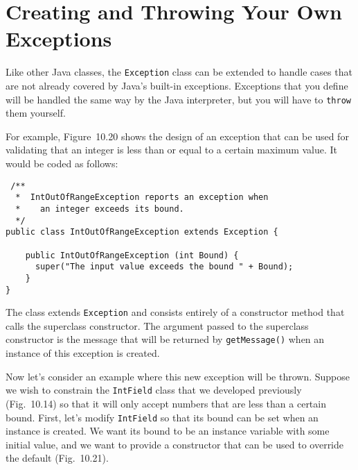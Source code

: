 \section{Creating and Throwing Your Own \\ Exceptions}
\label{sec-throws}\label{pg-sec-throws}

\noindent Like other Java classes, the {\tt Exception} class can be extended to
handle cases that are not already covered by Java's built-in
exceptions.  Exceptions that you define will be handled the same way
by the Java interpreter, but you will have to {\tt throw} them
yourself.

For example, Figure~10.20 shows the design of an exception
that can be used for validating that an integer is less than or equal
to a certain maximum value. It would be coded as follows:

\begin{jjjlisting}
\begin{lstlisting}
 /**
  *  IntOutOfRangeException reports an exception when 
  *    an integer exceeds its bound.
  */
public class IntOutOfRangeException extends Exception {

    public IntOutOfRangeException (int Bound) {
      super("The input value exceeds the bound " + Bound);
    }
}
\end{lstlisting}
\end{jjjlisting}

\noindent The class extends {\tt Exception} and consists entirely of
a constructor method that calls the superclass constructor.
The argument passed to the superclass constructor is the message
that will be returned by {\tt getMessage()} when an instance of
this exception is created.


Now let's consider an example where this new exception will be
thrown.  Suppose we wish to constrain the {\tt IntField} class that we
developed previously (Fig.~10.14) so that it will only
accept numbers that are less than a certain bound.   First, let's
modify {\tt IntField} so that its bound can be set when an
instance is created. We want its bound to be an instance
variable with some initial value, and we want to provide a
constructor that can be used to override the default
(Fig.~10.21).  

